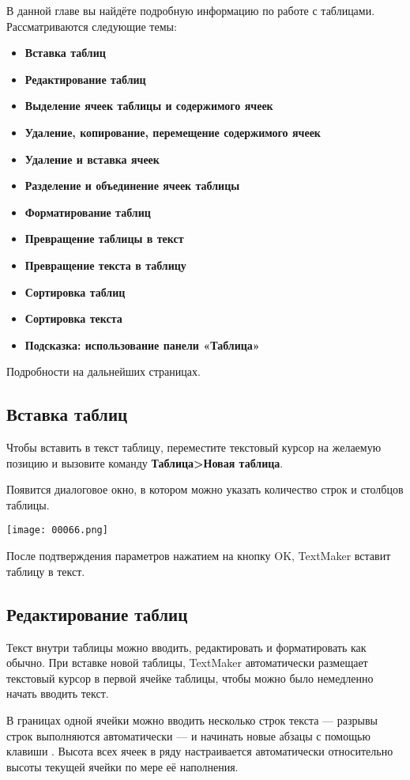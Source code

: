 ﻿\documentclass[a4paper,10pt]{article}
\begin{document}
В данной главе вы найдёте подробную информацию по работе с таблицами. Рассматриваются следующие темы:

\begin{itemize}
 \item \textbf{Вставка таблиц}
 \item \textbf{Редактирование таблиц}
 \item \textbf{Выделение ячеек таблицы и содержимого ячеек}
 \item \textbf{Удаление, копирование, перемещение содержимого ячеек}
 \item \textbf{Удаление и вставка ячеек}
 \item \textbf{Разделение и объединение ячеек таблицы}
 \item \textbf{Форматирование таблиц}
 \item \textbf{Превращение таблицы в текст}
 \item \textbf{Превращение текста в таблицу}
 \item \textbf{Сортировка таблиц}
 \item \textbf{Сортировка текста}
 \item \textbf{Подсказка: использование панели «Таблица»}
\end{itemize}
 Подробности на дальнейших страницах.
 
\subsection{Вставка таблиц}
Чтобы вставить в текст таблицу, переместите текстовый курсор на желаемую позицию и вызовите команду \textbf{Таблица>Новая таблица}.

Появится диалоговое окно, в котором можно указать количество строк и столбцов таблицы.

\texttt{[image: 00066.png]}

После подтверждения параметров нажатием на кнопку OK, TextMaker вставит таблицу в текст. 

\subsection{Редактирование таблиц}
Текст внутри таблицы можно вводить, редактировать и форматировать как обычно. При вставке новой таблицы, TextMaker автоматически размещает текстовый курсор в первой ячейке таблицы, чтобы можно было немедленно начать вводить текст.

В границах одной ячейки можно вводить несколько строк текста — разрывы строк выполняются автоматически — и начинать новые абзацы с помощью клавиши . Высота всех ячеек в ряду настраивается автоматически относительно высоты текущей ячейки по мере её наполнения.
\end{document}

